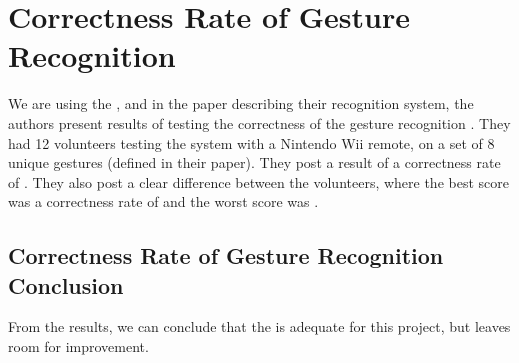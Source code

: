 \section{Correctness Rate of Gesture Recognition}\label{sec:gesturecorrectness}
We are using the \threedollar, 
and in the paper describing their recognition system, 
the authors present results of testing the correctness of the gesture recognition \cite{threedollar}.
They had \num{12} volunteers testing the system with a Nintendo Wii remote, 
on a set of \num{8} unique gestures (defined in their paper).
They post a result of a correctness rate of . 
They also post a clear difference between the volunteers, 
where the best score was a correctness rate of  and the worst score was . 
\subsection{Correctness Rate of Gesture Recognition Conclusion}
From the results, we can conclude that the \threedollar is adequate for this project, but leaves room for improvement. 
